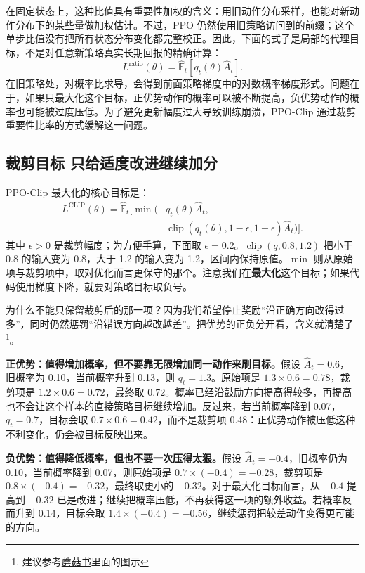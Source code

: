在固定状态上，这种比值具有重要性加权的含义：用旧动作分布采样，也能对新动作分布下的某些量做加权估计。不过，PPO 仍然使用旧策略访问到的前缀；这个单步比值没有把所有状态分布变化都完整校正。因此，下面的式子是局部的代理目标，不是对任意新策略真实长期回报的精确计算：
\[
    L^{\mathrm{ratio}}(\theta)
      =\widehat{\mathbb E}_{t}
        \left[q_t(\theta)\widehat A_t\right].
\]
在旧策略处，对概率比求导，会得到前面策略梯度中的对数概率梯度形式。问题在于，如果只最大化这个目标，正优势动作的概率可以被不断提高，负优势动作的概率也可能被过度压低。为了避免更新幅度过大导致训练崩溃，PPO-Clip 通过裁剪重要性比率的方式缓解这一问题。

\subsection{裁剪目标 只给适度改进继续加分}

PPO-Clip 最大化的核心目标是：
\[
\begin{split}
    L^{\mathrm{CLIP}}(\theta)
    =\widehat{\mathbb E}_{t}\Big[
       \min\big(&q_t(\theta)\widehat A_t,\\
       &\operatorname{clip}(q_t(\theta),1-\epsilon,1+\epsilon)
                          \widehat A_t\big)\Big].
\end{split}
\]
其中 $\epsilon>0$ 是裁剪幅度；为方便手算，下面取 $\epsilon=0.2$。$\operatorname{clip}(q,0.8,1.2)$ 把小于 0.8 的输入变为 0.8，大于 1.2 的输入变为 1.2，区间内保持原值。$\min$ 则从原始项与裁剪项中，取对优化而言更保守的那个。注意我们在\textbf{最大化}这个目标；如果代码使用梯度下降，就要对策略目标取负号。

为什么不能只保留裁剪后的那一项？因为我们希望停止奖励``沿正确方向改得过多''，同时仍然惩罚``沿错误方向越改越差''。把优势的正负分开看，含义就清楚了\footnote{建议参考\href{https://datawhalechina.github.io/easy-rl/\#/chapter5/chapter5?id=\_522\-\%e8\%bf\%91\%e7\%ab\%af\%e7\%ad\%96\%e7\%95\%a5\%e4\%bc\%98\%e5\%8c\%96\%e8\%a3\%81\%e5\%89\%aa}{蘑菇书}里面的图示}。

\textbf{正优势：值得增加概率，但不要靠无限增加同一动作来刷目标。}假设 $\widehat A_t=0.6$，旧概率为 0.10，当前概率升到 0.13，则 $q_t=1.3$。原始项是 $1.3\times0.6=0.78$，裁剪项是 $1.2\times0.6=0.72$，最终取 0.72。概率已经沿鼓励方向提高得较多，再提高也不会让这个样本的直接策略目标继续增加。反过来，若当前概率降到 0.07，$q_t=0.7$，目标会取 $0.7\times0.6=0.42$，而不是裁剪项 0.48：正优势动作被压低这种不利变化，仍会被目标反映出来。

\textbf{负优势：值得降低概率，但也不要一次压得太狠。}假设 $\widehat A_t=-0.4$，旧概率仍为 0.10，当前概率降到 0.07，则原始项是 $0.7\times(-0.4)=-0.28$，裁剪项是 $0.8\times(-0.4)=-0.32$，最终取更小的 $-0.32$。对于最大化目标而言，从 $-0.4$ 提高到 $-0.32$ 已是改进；继续把概率压低，不再获得这一项的额外收益。若概率反而升到 0.14，目标会取 $1.4\times(-0.4)=-0.56$，继续惩罚把较差动作变得更可能的方向。

